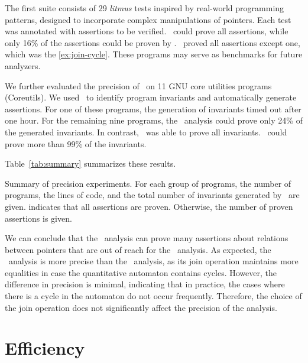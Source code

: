 The first suite consists of 29 \emph{litmus} tests inspired by real-world programming patterns,
designed to incorporate complex manipulations of pointers.
Each test was annotated with assertions to be verified.
\cpou\ could prove all assertions,
while only 16\% of the assertions could be proven by \base.
\cpod\ proved all assertions except one, which was the \cref{ex:join-cycle}.
These programs may serve as benchmarks for future analyzers.

We further evaluated the precision of \cpo\ on 11 GNU core utilities programs (Coreutils).
We used \cpou\ to identify program invariants and automatically generate assertions.
For one of these programs, the generation of invariants timed out after one hour.
For the remaining nine programs, the \base\ analysis could prove only 24\% of the generated invariants.
In contrast, \cpou\ was able to prove all invariants.
\cpod\ could prove more than 99\% of the invariants.

Table~\ref{tab:summary} summarizes these results.

\begin{table}[t]
    \centering
    \caption[Results of experiments on litmus tests and Coreutils.]{Summary of precision experiments. For each group of programs, the number of programs, the lines of code, and the total number of invariants generated by \cpou\ are given.
         indicates that all assertions are proven. Otherwise, the number of proven assertions is given.}\label{tab:summary}
    
\end{table}

We can conclude that the \cpo\ analysis can prove many assertions about relations between pointers that are out of reach for the \base\ analysis.
As expected, the \cpou\ analysis is more precise than the \cpod\ analysis, as its join operation maintains more equalities in case the quantitative automaton contains cycles.
However, the difference in precision is minimal, indicating that in practice, the cases where there is a cycle in the automaton do not occur frequently.
Therefore, the choice of the join operation does not significantly affect the precision of the analysis.

\section{Efficiency}


